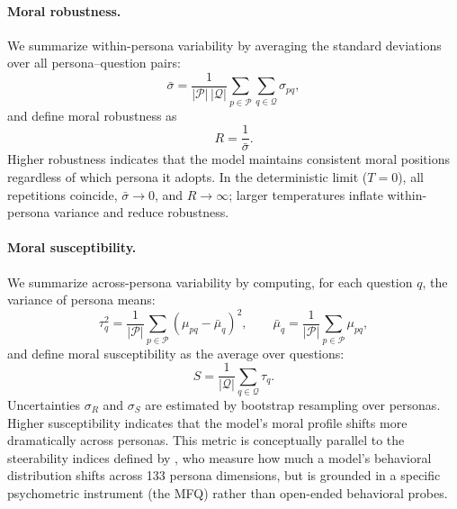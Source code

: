 \documentclass{article}
\begin{document}
\paragraph{Moral robustness.} We summarize within-persona variability by averaging the standard deviations over all persona--question pairs:
\begin{equation}
  \bar{\sigma} = \frac{1}{|\mathcal{P}|\,|\mathcal{Q}|} \sum_{p \in \mathcal{P}} \sum_{q \in \mathcal{Q}} \sigma_{pq},
  \label{eq:mean-sigma}
\end{equation}
and define moral robustness as
\begin{equation}
  R = \frac{1}{\bar{\sigma}}.
  \label{eq:robustness}
\end{equation}
Higher robustness indicates that the model maintains consistent moral positions regardless of which persona it adopts. In the deterministic limit ($T=0$), all repetitions coincide, $\bar{\sigma} \to 0$, and $R \to \infty$; larger temperatures inflate within-persona variance and reduce robustness.

\paragraph{Moral susceptibility.} We summarize across-persona variability by computing, for each question $q$, the variance of persona means:
\begin{equation}
  \tau_q^2 = \frac{1}{|\mathcal{P}|} \sum_{p \in \mathcal{P}} (\mu_{pq} - \bar{\mu}_q)^2, \qquad
  \bar{\mu}_q = \frac{1}{|\mathcal{P}|} \sum_{p \in \mathcal{P}} \mu_{pq},
  \label{eq:question-dispersion}
\end{equation}
and define moral susceptibility as the average over questions:
\begin{equation}
  S = \frac{1}{|\mathcal{Q}|} \sum_{q \in \mathcal{Q}} \tau_q.
  \label{eq:susceptibility}
\end{equation}
Uncertainties $\sigma_R$ and $\sigma_S$ are estimated by bootstrap resampling over personas. Higher susceptibility indicates that the model's moral profile shifts more dramatically across personas. This metric is conceptually parallel to the steerability indices defined by \citet{miehling2025steerability}, who measure how much a model's behavioral distribution shifts across 133 persona dimensions, but is grounded in a specific psychometric instrument (the MFQ) rather than open-ended behavioral probes.
\end{document}
